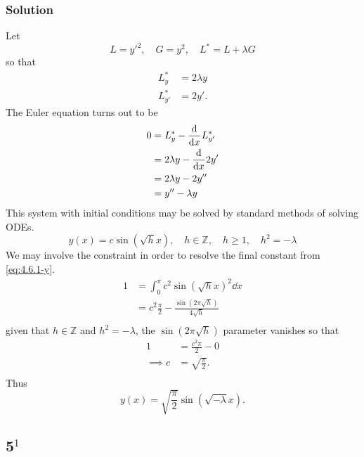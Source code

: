 \documentclass[12pt,twoside]{article}
\begin{document}
\subsubsection*{Solution}
Let
\begin{equation*}
  L = {y'}^2,\quad G = y^2, \quad L^* = L+\lambda G
\end{equation*}
so that
\begin{align*}
  L^*_y &= 2\lambda y \\
  L^*_{y'} &= 2y'.
\end{align*}
The Euler equation turns out to be
\begin{align*}
  0 &= L^*_y - \frac{\mathrm{d}^{} {}}{\mathrm{d}{x}^{}}L^*_{y'} \\
    &= 2\lambda y - \frac{\mathrm{d}^{} {}}{\mathrm{d}{x}^{}} 2y' \\
    &= 2\lambda y - 2y'' \\
    &= y'' - \lambda y
\end{align*}
This system with initial conditions may be solved by standard methods of solving
ODEs.
\begin{equation}
  \label{eq:4.6.1-y}
  y(x) = c \sin(\sqrt{h}x),\quad h \in \mathbb{Z},\quad h\ge1, \quad h^2=-\lambda
\end{equation}
We may involve the constraint in order to resolve the final constant from
\cref{eq:4.6.1-y}.
\begin{align*}
  1 &= \int_0^{\pi} c^2 {\sin(\sqrt{h}x)}^2 \dd{x} \\
    &= c^2\frac{\pi}{2}-\frac{\sin(2\pi\sqrt{h})}{4\sqrt{h}} \\
\end{align*}
given that $h\in\mathbb{Z}$ and $h^2=-\lambda$, the $\sin(2\pi\sqrt{h})$
parameter vanishes so that
\begin{align*}
  1 &= \frac{c^2\pi}{2} - 0 \\
  \implies c &= \sqrt{\frac{\pi}{2}}. \\
\end{align*}
Thus
\begin{equation*}
  \boxed{y(x) = \sqrt{\frac{\pi}{2}} \sin\left(\sqrt{-\lambda}x\right).}
\end{equation*}

\subsection{5$^1$}
\end{document}
